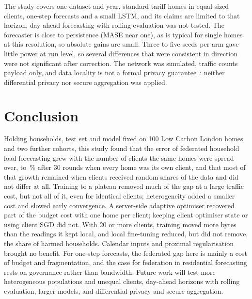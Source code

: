 The study covers one dataset and year, standard-tariff homes in equal-sized clients, one-step forecasts and a small LSTM,
and its claims are limited to that horizon; day-ahead forecasting with rolling evaluation was not tested. The forecaster
is close to persistence (MASE near one), as is typical for single homes at this resolution, so absolute gains are small.
Three to five seeds per arm gave little power at run level, so several differences that were consistent in direction were not
significant after correction. The network was simulated, traffic counts payload only, and data locality is not a formal
privacy guarantee~\cite{zhu2019leakage,geiping2020inverting}: neither differential privacy nor secure aggregation was
applied.

\section{Conclusion}

Holding households, test set and model fixed on 100 Low Carbon London homes and two further cohorts, this study found
that the error of federated household load forecasting grew with the number of clients the same homes were spread
over, to \RvHomeKhundredGap{}\,\% after 30 rounds when every home was its own client, and that most of that growth
remained when clients received random shares of the data and did not differ at all. Training to a plateau removed much
of the gap at a large traffic cost, but not all of it, even for identical clients; heterogeneity added a smaller cost
and slowed early convergence. A server-side adaptive optimiser recovered part of the budget cost with one home per
client; keeping client optimiser state or using client SGD did not. With 20 or more clients, training moved more bytes than the readings
it kept local, and local fine-tuning reduced, but did not remove, the share of harmed households. Calendar inputs and
proximal regularisation brought no benefit. For one-step forecasts, the federated gap here is mainly a cost of budget
and fragmentation, and the case for federation in residential forecasting rests on governance rather than bandwidth.
Future work will test more heterogeneous populations and unequal clients, day-ahead horizons with rolling evaluation,
larger models, and differential privacy and secure aggregation.

